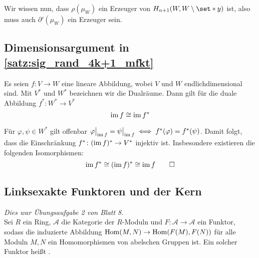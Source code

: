 \begin{beweis}[{name={\cite[\RM{14}. Th.~7.6]{Massey}}}]
	Wir wissen nun, dass $\rho(\mu_W)$ ein Erzeuger von $H_{n+1} (W,W\setminus \set*{y})$ ist, also muss auch $\partial'(\mu_W)$ ein Erzeuger sein.
\end{beweis}



\subsection{Dimensionsargument in \autoref{satz:sig_rand_4k+1_mfkt}} %
\label{sub:dimensionsargument_rand_mfkt}
Es seien $f \colon V \to W$ eine lineare Abbildung, wobei $V$ und $W$ endlichdimensional sind. 
Mit $V^*$ und $W^*$ bezeichnen wir die Dualräume.
Dann gilt für die duale Abbildung $f^* \colon W^* \to V^*$
\[
	\operatorname{im} f \cong \operatorname{im} f^*
\]
\begin{beweis}
	Für $\varphi,\psi \in W^*$ gilt offenbar
	\(
		\varphi\big|_{\operatorname{im} f} = \psi\big|_{\operatorname{im} f} \iff f^*(\varphi) = f^*(\psi)
	\).
	Damit folgt, dass die Einschränkung $f^* \colon (\operatorname{im} f)^* \to V^*$ injektiv ist.
	Insbesondere existieren die folgenden Isomorphismen:
	\[
		\operatorname{im} f^* \cong (\operatorname{im} f)^* \cong \operatorname{im} f \qedhere
	\]
\end{beweis}

\subsection{Linksexakte Funktoren und der Kern} %
\label{sub:exakte_funktoren_und_der_kern}
\emph{Dies war Übungsaufgabe 2 von Blatt 8.}\smallskip \\
Sei $R$ ein Ring, $\mathcal{A}$ die Kategorie der $R$-Moduln und $F \colon \mathcal{A} \to \mathcal{A}$ ein Funktor, sodass die induzierte Abbildung $\Hom(M,N) \to \Hom \enbrace*{F(M), F(N)}$ für alle Moduln $M,N$ ein Homomorphismen von abelschen Gruppen ist. 
Ein solcher Funktor heißt .

